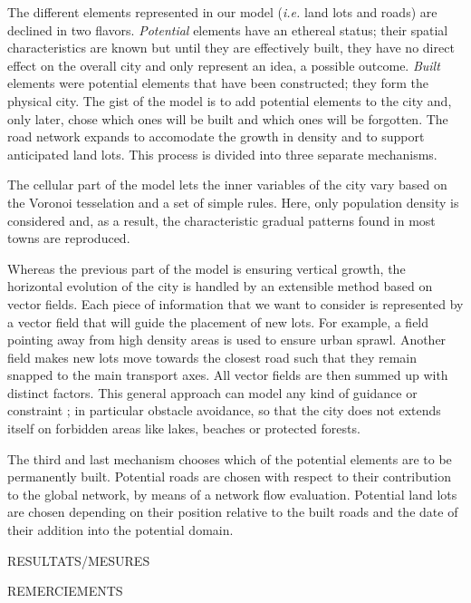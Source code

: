 \documentclass[12pt]{article}
\begin{document}
The different elements represented in our model (\textit{i.e.} land
lots and roads) are declined in two flavors. \textit{Potential}
elements have an ethereal status; their spatial characteristics are
known but until they are effectively built, they have no direct effect
on the overall city and only represent an idea, a possible
outcome. \textit{Built} elements were potential elements that have
been constructed; they form the physical city. The gist of the model
is to add potential elements to the city and, only later, chose which
ones will be built and which ones will be forgotten. The road network
expands to accomodate the growth in density and to support anticipated
land lots. This process is divided into three separate mechanisms.

The cellular part of the model lets the inner variables of the city
vary based on the Voronoi tesselation and a set of simple rules. Here,
only population density is considered and, as a result, the
characteristic gradual patterns found in most towns are reproduced.

Whereas the previous part of the model is ensuring vertical growth,
the horizontal evolution of the city is handled by an extensible
method based on vector fields. Each piece of information that we want
to consider is represented by a vector field that will guide the
placement of new lots. For example, a field pointing away from high
density areas is used to ensure urban sprawl. Another field makes new
lots move towards the closest road such that they remain snapped to
the main transport axes. All vector fields are then summed up with
distinct factors. This general approach can model any kind of guidance
or constraint ; in particular obstacle avoidance, so that the city
does not extends itself on forbidden areas like lakes, beaches or
protected forests.

The third and last mechanism chooses which of the potential elements
are to be permanently built. Potential roads are chosen with respect
to their contribution to the global network, by means of a network
flow evaluation. Potential land lots are chosen depending on their
position relative to the built roads and the date of their addition
into the potential domain.

RESULTATS/MESURES

\newpage

\tableofcontents

\newpage

REMERCIEMENTS

\newpage
\end{document}
